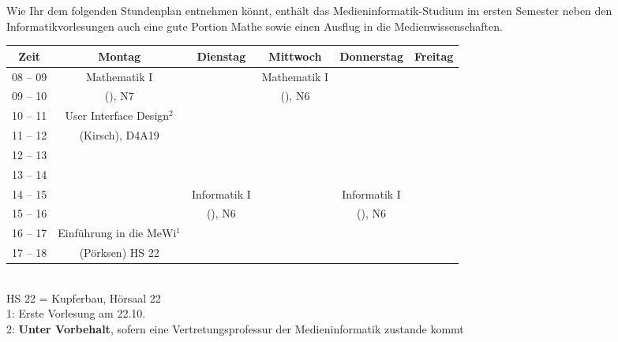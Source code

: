 
Wie Ihr dem folgenden Stundenplan entnehmen könnt, enthält das Medieninformatik-Studium im ersten
Semester neben den Informatikvorlesungen auch eine gute Portion Mathe sowie einen Ausflug in die Medienwissenschaften. 

\begin{center}
	\begin{tabular}{|c|c|c|c|c|c|} \hline
		Zeit      & 			Montag 		& Dienstag			& Mittwoch 			& Donnerstag 			& Freitag	 \\
		\hline\hline
		08 -- 09  & 		Mathematik I 	&  					& Mathematik I 		&  						&			\\
		\cline{1-1}\cline{3-3}\cline{5-6}
		09 -- 10  & 		(\Matheprof), N7& 					& (\Matheprof), N6  &  						&			\\
		\hline
		10 -- 11  &	User Interface Design$^2$	&					&					&						&			\\
		\cline{1-1}\cline{3-6}
		11 -- 12 & 	(Kirsch), D4A19			&  					&					&			 			& 			\\
		\hline
		12 -- 13 & 							&  					& 				    & 						& 			 \\
		\hline
		13 -- 14 & 							& 					&   				 & 						& 			 \\
		\hline
		14 -- 15 & 							& Informatik I 		& 					& Informatik I 			& 				\\
		\cline{1-2}\cline{4-4}\cline{6-6}
		15 -- 16 &							& (\Infoprof), N6 	& 					& (\Infoprof), N6 		& 				\\
		\hline
		16 -- 17 & Einführung in die MeWi$^1$ &  	 & 		&						&\\
		\cline{1-1}\cline{3-6}
		17 -- 18 & 	(Pörksen) HS 22 	 	&  &					& 						& \\
		\hline
	\end{tabular}\\
\scriptsize HS 22 = Kupferbau, Hörsaal 22 \\
1: Erste Vorlesung am 22.10.\\
2: \textbf{Unter Vorbehalt}, sofern eine Vertretungsprofessur der Medieninformatik zustande kommt

\end{center}

